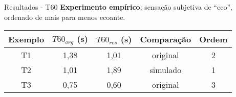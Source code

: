 \begin{frame}{Resultados - T60}
    \textbf{Experimento empírico}: sensação subjetiva de “eco”, ordenado de mais para menos ecoante.
    \vspace{1cm}

    \begin{table} [H]
        \centering
        \begin{tabular}{c|c|c|c|c}
    
            \textbf{Exemplo} & 
            \textbf{$T60_{org}$ (s)} & 
            \textbf{$T60_{res}$ (s)} & 
            \textbf{Comparação} &
            \textbf{Ordem} \\
            \hline 
    
            T1 & 1,38 & 1,01 & original & 2 \\
            T2 & 1,01 & 1,89 & simulado & 1 \\
            T3 & 0,75 & 0,60 & original & 3 \\
    
        \end{tabular}
    \end{table}
\end{frame}

